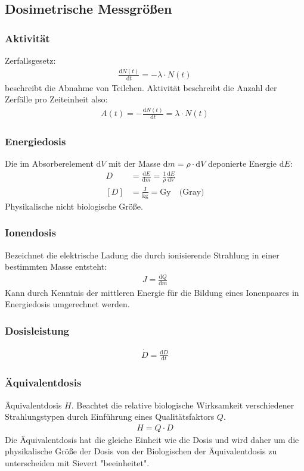 \documentclass[11pt, a4paper]{article}
\numberwithin{equation}{section}
\begin{document}
\subsection{Dosimetrische Messgrößen}

\subsubsection{Aktivität}
Zerfallsgesetz:
\begin{align}
	\frac{\mathrm{d} N(t)}{\mathrm{d} t} = - \lambda \cdot N(t)
\end{align}
beschreibt die Abnahme von Teilchen.
Aktivität beschreibt die Anzahl der Zerfälle pro Zeiteinheit also:
\begin{align}
	A(t) = - \frac{\mathrm{d} N(t)}{\mathrm{d} t} = \lambda \cdot N(t)
\end{align}

\subsubsection{Energiedosis}
Die im Absorberelement $\mathrm{d}V$ mit der Masse $\mathrm{d} m = \rho \cdot \mathrm{d}V$ deponierte Energie $\mathrm{d}E$:
\begin{align}
	D &= \frac{\mathrm{d}E}{\mathrm{d}m} = \frac{1}{\rho}\frac{\mathrm{d}E}{\mathrm{d}V}\\
	[D] &= \frac{\mathrm{J}}{\mathrm{kg}} = \mathrm{Gy} \quad \text{(Gray)}
\end{align}
Physikalische nicht biologische Größe.

\subsubsection{Ionendosis}
Bezeichnet die elektrische Ladung die durch ionisierende Strahlung in einer bestimmten Masse entsteht:
\begin{align}
	J = \frac{\mathrm{d}Q}{\mathrm{d}m}
\end{align}
Kann durch Kenntnis der mittleren Energie für die Bildung eines Ionenpaares in Energiedosis umgerechnet werden.

\subsubsection{Dosisleistung}
\begin{align}
	\dot{D} = \frac{\mathrm{d}D}{\mathrm{d}t}
\end{align}

\subsubsection{Äquivalentdosis}
Äquivalentdosis $H$.
Beachtet die relative biologische Wirksamkeit verschiedener Strahlungstypen durch Einführung eines Qualitätsfaktors $Q$.
\begin{align}
	H = Q \cdot D
\end{align}
Die Äquivalentdosis hat die gleiche Einheit wie die Dosis und wird daher um die physikalische Größe der Dosis von der Biologischen der Äquivalentdosis zu unterscheiden mit Sievert "beeinheitet".
\end{document}
